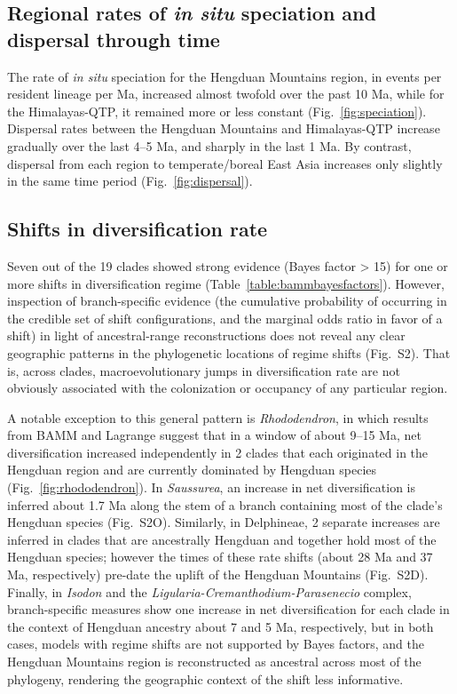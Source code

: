 \documentclass[9pt,twocolumn,twoside,lineno]{pnas-new}
\begin{document}
\subsection*{Regional rates of \textit{in situ} speciation and
  dispersal through time}

The rate of \textit{in situ} speciation for the Hengduan Mountains
region, in events per resident lineage per Ma, increased almost
twofold over the past 10 Ma, while for the Himalayas-QTP, it remained
more or less constant (Fig.~\ref{fig:speciation}). Dispersal rates
between the Hengduan Mountains and Himalayas-QTP increase gradually
over the last 4--5 Ma, and sharply in the last 1 Ma. By contrast,
dispersal from each region to temperate/boreal East Asia increases
only slightly in the same time period (Fig.~\ref{fig:dispersal}).

\subsection*{Shifts in diversification rate}

Seven out of the 19 clades showed strong evidence (Bayes factor > 15)
for one or more shifts in diversification regime
(Table~\ref{table:bammbayesfactors}). However, inspection of
branch-specific evidence (the cumulative probability of occurring in
the credible set of shift configurations, and the marginal odds ratio
in favor of a shift) in light of ancestral-range reconstructions does
not reveal any clear geographic patterns in the phylogenetic locations
of regime shifts (Fig.~S2). That is, across clades, macroevolutionary
jumps in diversification rate are not obviously associated with the
colonization or occupancy of any particular region.

A notable exception to this general pattern is \emph{Rhododendron}, in
which results from BAMM and Lagrange suggest that in a window of about
9--15 Ma, net diversification increased independently in 2 clades that
each originated in the Hengduan region and are currently dominated by
Hengduan species (Fig.~\ref{fig:rhododendron}). In \emph{Saussurea},
an increase in net diversification is inferred about 1.7 Ma along the
stem of a branch containing most of the clade's Hengduan species
(Fig.~S2O). Similarly, in Delphineae, 2 separate increases are
inferred in clades that are ancestrally Hengduan and together hold
most of the Hengduan species; however the times of these rate shifts
(about 28 Ma and 37 Ma, respectively) pre-date the uplift of the
Hengduan Mountains (Fig.~S2D). Finally, in \emph{Isodon} and the
\emph{Ligularia-Cremanthodium-Parasenecio} complex, branch-specific
measures show one increase in net diversification for each clade in
the context of Hengduan ancestry about 7 and 5 Ma, respectively, but
in both cases, models with regime shifts are not supported by Bayes
factors, and the Hengduan Mountains region is reconstructed as
ancestral across most of the phylogeny, rendering the geographic
context of the shift less informative.
\end{document}
